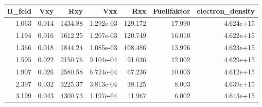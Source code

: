 \begin{tabular}{rrrrrrr}
\toprule
 B\_feld &    Vxy &      Rxy &        Vxx &      Rxx &  Fuellfaktor &  electron\_density \\
\midrule
  1.063 &  0.014 &  1434.88 &  1.292e-03 &  129.172 &       17.990 &         4.624e+15 \\
  1.194 &  0.016 &  1612.25 &  1.207e-03 &  120.749 &       16.010 &         4.622e+15 \\
  1.366 &  0.018 &  1844.24 &  1.085e-03 &  108.486 &       13.996 &         4.623e+15 \\
  1.595 &  0.022 &  2150.76 &  9.104e-04 &   91.036 &       12.002 &         4.629e+15 \\
  1.907 &  0.026 &  2580.58 &  6.724e-04 &   67.236 &       10.003 &         4.612e+15 \\
  2.397 &  0.032 &  3225.37 &  3.813e-04 &   38.125 &        8.003 &         4.639e+15 \\
  3.199 &  0.043 &  4300.73 &  1.197e-04 &   11.967 &        6.002 &         4.643e+15 \\
\bottomrule
\end{tabular}
